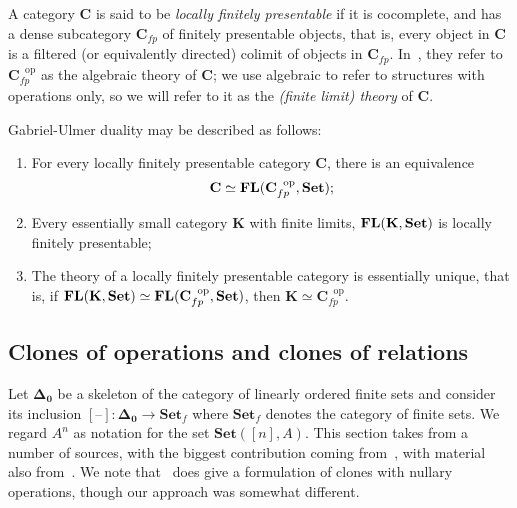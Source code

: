 \documentclass[11pt, a4paper, twoside,leqno]{amsart}
\newcommand{\cat}[1]{\mathbf{#1}}
\newcommand{\thg}{{\mathord{\text{--}}}}
\numberwithin{equation}{section}
\theoremstyle{plain}
\theoremstyle{definition}
\newcommand{\Set}{\cat{Set}}
\DeclareMathOperator{\FL}{\bf FL}
\begin{document}
A category \(\cat{C}\) is said to be \emph{locally finitely presentable} if it is
cocomplete, and has a dense subcategory \(\cat{C}_{fp}\) of finitely
presentable objects, that is, every object in \(\cat{C}\) is a filtered (or equivalently
directed) colimit of objects in \(\cat{C}_{fp}\).
In~\cite{Adamek:1998aa}, they refer to \(\cat{C}_{fp}^{\;\;\mathrm{op}}\)
as the algebraic theory of \(\cat{C}\); we use algebraic
to refer to structures with operations only, so we
will refer to it as the \emph{(finite limit) theory} of \(\cat{C}\).

Gabriel-Ulmer duality may be described as follows:
\begin{enumerate}[label=(\Roman*), ref=(\Roman*)]
  \item
    \label{it:lfp-to-th}
    For every locally finitely presentable category \(\cat{C}\), there is
an equivalence
\begin{equation*}
  \cat{C} \simeq \FL(\cat{C}_{fp}^{\;\;\mathrm{op}},\Set);
\end{equation*}
\item
  \label{it:th-to-lfp}
  Every essentially small category \(\cat{K}\) with finite
limits, \(\FL(\cat{K},\Set)\) is locally finitely
presentable;
\item
  \label{it:th-lfp-unique}
  The theory of a locally finitely presentable category is essentially
  unique, that is, if \( \FL(\cat{K},\Set) \simeq
\FL(\cat{C}_{fp}^{\;\;\mathrm{op}},\Set)\), then
\(\cat{K}\simeq \cat{C}_{fp}^{\;\;\mathrm{op}}\).
\end{enumerate}



\subsection{Clones of operations and clones of relations}
\label{sec:clones-rel-clones}

Let \(\cat{\Delta_{0}}\) be a skeleton of the category of linearly
ordered finite
sets and consider its inclusion \([\thg] \colon
\cat{\Delta_{0}} \rightarrow \cat{Set}_{f}\) where \(\cat{Set}_{f}\) denotes
the category of finite sets. We regard \(A^{n}\) as notation for the
set \(\Set([n],A)\). This section takes from a number of sources, with
the biggest contribution coming from~\cite{Freese:2022aa}, with
material also from~\cite{Kerkhoff:2014aa}. We note
  that~\cite{Behrisch:2014aa} does give a formulation of clones with
  nullary operations, though our approach was somewhat different.
\end{document}

